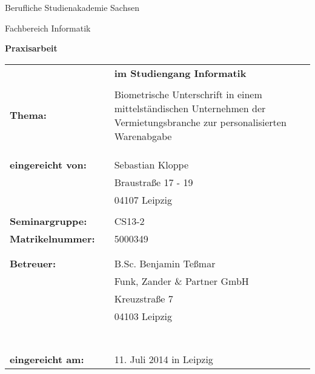 \thispagestyle{empty}
\begin{center}
\Large{Berufliche Studienakademie Sachsen}
\end{center}
 
\begin{center}
\Large{Fachbereich Informatik}
\end{center}
\hspace{4cm}

\begin{center}
\textbf{\LARGE{Praxisarbeit}}
\end{center}
\hspace{4cm}

\begin{flushleft}
\begin{tabular}{l p{10pt} p{290pt}}
& & \textbf{im Studiengang Informatik}\\
\\
\textbf{Thema:} & &  Biometrische Unterschrift in einem mittelständischen Unternehmen 
der Vermietungsbranche zur personalisierten Warenabgabe\\
& & \\
& & \\
& & \\
\textbf{eingereicht von:} & & Sebastian Kloppe \\
& &                           Braustraße 17 - 19\\
& &                           04107 Leipzig\\
& & \\
\textbf{Seminargruppe:} & & CS13-2 \\
\textbf{Matrikelnummer:} & & 5000349\\
& & \\
& & \\
\textbf{Betreuer:} & & B.Sc. Benjamin Teßmar\\
& &                    Funk, Zander \& Partner GmbH\\
& &                    Kreuzstraße 7\\
& &                    04103 Leipzig\\
& & \\
& & \\
& & \\
& & \\
& & \\
& & \\
& & \\
\textbf{eingereicht am:} & & 11. Juli 2014 in Leipzig\\
\end{tabular}
\end{flushleft}